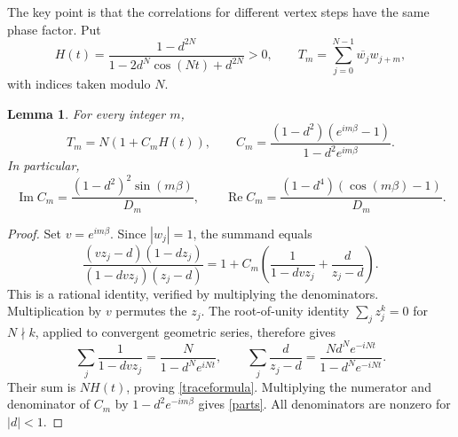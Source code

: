 \documentclass[11pt]{article}
\newtheorem{lemma}{Lemma}
\begin{document}
The key point is that the correlations for different vertex steps have
the same phase factor. Put
\[
 H(t)=\frac{1-d^{2N}}{1-2d^N\cos(Nt)+d^{2N}}>0,\qquad
 T_m=\sum_{j=0}^{N-1}\overline{w_j}w_{j+m},
\]
with indices taken modulo $N$.
\begin{lemma}\label{trace}
For every integer $m$,
\begin{equation}\label{traceformula}
 T_m=N(1+C_mH(t)),\qquad
 C_m=\frac{(1-d^2)(e^{im\beta}-1)}{1-d^2e^{im\beta}}.
\end{equation}
In particular,
\begin{equation}\label{parts}
 \operatorname{Im}C_m=\frac{(1-d^2)^2\sin(m\beta)}{D_m},\qquad
 \operatorname{Re}C_m=\frac{(1-d^4)(\cos(m\beta)-1)}{D_m}.
\end{equation}
\end{lemma}
\begin{proof}
Set $v=e^{im\beta}$. Since $|w_j|=1$, the summand equals
\[
 \frac{(vz_j-d)(1-dz_j)}{(1-dvz_j)(z_j-d)}
 =1+C_m\left(\frac1{1-dvz_j}+\frac{d}{z_j-d}\right).
\]
This is a rational identity, verified by multiplying the denominators.
Multiplication by $v$ permutes the $z_j$. The root-of-unity identity
$\sum_jz_j^k=0$ for $N\nmid k$, applied to convergent geometric series,
therefore gives
\[
 \sum_j\frac1{1-dvz_j}=\frac{N}{1-d^Ne^{iNt}},\qquad
 \sum_j\frac{d}{z_j-d}=\frac{Nd^Ne^{-iNt}}{1-d^Ne^{-iNt}}.
\]
Their sum is $NH(t)$, proving \eqref{traceformula}. Multiplying the
numerator and denominator of $C_m$ by $1-d^2e^{-im\beta}$ gives
\eqref{parts}. All denominators are nonzero for $|d|<1$.
\end{proof}
\end{document}
